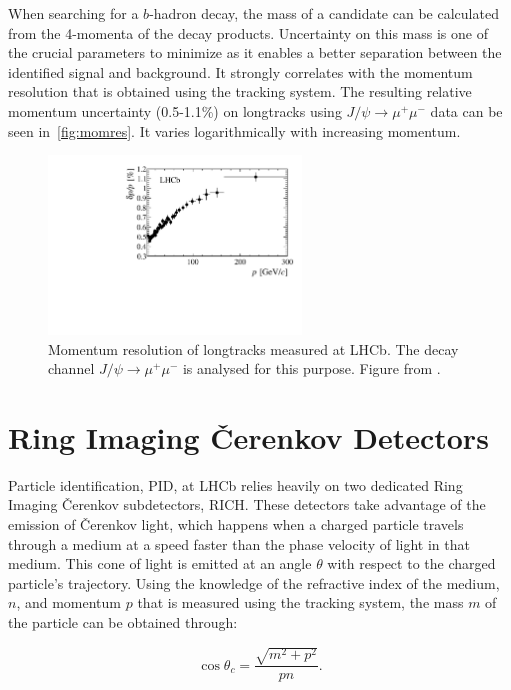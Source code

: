 When searching for a $b$-hadron decay, the mass of a candidate can be calculated from the 4-momenta of the decay products. Uncertainty on this mass is one of the crucial parameters to minimize as it enables a better separation between the identified signal and background. It strongly correlates with the momentum resolution that is obtained using the tracking system. The resulting relative momentum uncertainty (0.5-1.1\%) on \gls{longtrack}s using $J/\psi \rightarrow \mu^{+} \mu^{-}$ data can be seen in~\autoref{fig:momres}. It varies logarithmically with increasing momentum.


\begin{figure}[!h]
	\centering
	\includegraphics[width = 0.6\textwidth]{figs/detector/Fig17.pdf}
	\caption{Momentum resolution of \gls{longtrack}s measured at \gls{LHCb}. The decay channel $J/\psi \rightarrow \mu^{+} \mu^{-}$ is analysed for this purpose. Figure from \cite{LHCb-DP-2014-002}.}
	\label{fig:momres}
\end{figure}

\section{Ring Imaging \v{C}erenkov Detectors}
\label{richsec}
Particle identification, \Gls{PID}, at \Gls{LHCb} relies heavily on two dedicated Ring Imaging \v{C}erenkov subdetectors, \gls{RICH}. These detectors take advantage of the emission of \v{C}erenkov light, which happens when a charged particle travels through a medium at a speed faster than the phase velocity of light in that medium. This cone of light is emitted at an angle $\theta$ with respect to the charged particle's trajectory. Using the knowledge of the refractive index of the medium, $n$, and momentum $p$ that is measured using the tracking system, the mass $m$ of the particle can be obtained through:

\begin{equation}
	\cos\theta_{c} =  \frac{\sqrt{m^{2} + p^{2}}}{pn}.
\end{equation}

